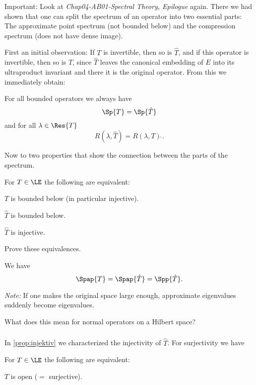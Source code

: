\documentclass[%
	,english 
	,headings	= small 
	,leqno
	,parskip		= half+
	,DIV			= 14
	,BCOR 			= 10mm	
		]{scrartcl}
\begin{document}
\begin{multicols}{2}
\subsubsection{}
Important: Look at \emph{Chap04-AB01-Spectral Theory, Epilogue} again.
There we had shown that one can split the spectrum of an operator into two essential parts: The approximate point spectrum (not bounded below) and the compression spectrum (does not have dense image).

First an initial observation: If $ T $ is invertible, then so is $ \hat{T} $, and if this operator is invertible, then so is $ T $, since $ \hat{T} $ leaves the canonical embedding of $ E $ into its ultraproduct invariant and there it is the original operator.
From this we immediately obtain:
%
\begin{proposition}
For all bounded operators we always have 
%
\[
    \Sp{ T } = \Sp{ \hat{ T } } 
\]
%
and for all $ \lambda \in \Res{ T } $
%
\[
    R( \lambda, \hat{ T } ) = R( \lambda , T )\hat \,  . 
\]
%
\end{proposition}
%
Now to two properties that show the connection between the parts of the spectrum.
%
\begin{proposition}\label{prop:injektiv}
For $ T \in \LE $ the following are equivalent:
%
\begin{myequivalent}
	\item
	$ T $ is bounded below (in particular injective).
	
	\item
	$ \hat{ T } $ is bounded below.
	
	\item
	$ \hat{ T } $ is injective.
\end{myequivalent}
\end{proposition}
%
\begin{exercise}
Prove these equivalences.
\end{exercise}
%
\begin{corollary}
We have
%
\[
    \Spap{ T } = \Spap{ \hat{ T } } = \Spp{ \hat{ T } }  . 
\]
%
\end{corollary}
%
\emph{Note: } If one makes the original space large enough, approximate eigenvalues suddenly become eigenvalues.
%
\begin{exercise}
What does this mean for normal operators on a Hilbert space?
\end{exercise}
%
\subsubsection{}
In \vref{prop:injektiv} we characterized the injectivity of $ \hat{ T } $. 
For surjectivity we have 
% 
\begin{proposition}\label{prop:surjektiv}
For $ T \in \LE $ the following are equivalent:
%
\begin{myequivalent}
	\item
	$ T $ is open ($ = $ surjective).
	

\end{myequivalent}
\end{proposition}
\end{multicols}
\end{document}
